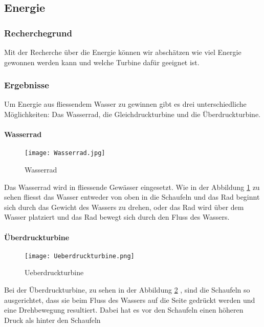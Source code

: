 \subsection{Energie}

\subsubsection{Recherchegrund}

Mit der Recherche über die Energie können wir abschätzen wie viel Energie gewonnen werden kann und welche Turbine dafür geeignet ist.

\subsubsection{Ergebnisse}

Um Energie aus fliessendem Wasser zu gewinnen gibt es drei unterschiedliche Möglichkeiten: Das Wasserrad, die Gleichdruckturbine und die Überdruckturbine. 

\paragraph{Wasserrad}
\begin{figure}[H]
	\centering
	\texttt{[image: Wasserrad.jpg]}
	\caption{Wasserrad \cite{wisse}} 
	\label{fig:Wasserrad}
\end{figure}

Das Wasserrad wird in fliessende Gewässer eingesetzt. Wie in der Abbildung \ref{fig:Wasserrad}  zu sehen fliesst das Wasser entweder von oben in die Schaufeln und das Rad beginnt sich durch das Gewicht des Wassers zu drehen, oder das Rad wird über dem Wasser platziert und das Rad bewegt sich durch den Fluss des Wassers.

\newpage

\paragraph{Überdruckturbine}
\begin{figure} [H]
	\centering
	\texttt{[image: Ueberdruckturbine.png]}
	\caption{Ueberdruckturbine \cite{wiki_ueberdruck}}
	\label{fig:Ueberdruckturbine}
\end{figure}

Bei der Überdruckturbine, zu sehen in der Abbildung \ref{fig:Ueberdruckturbine} , sind die Schaufeln so ausgerichtet, dass sie beim Fluss des Wassers auf die Seite gedrückt werden und eine Drehbewegung resultiert. Dabei hat es vor den Schaufeln einen höheren Druck als hinter den Schaufeln

